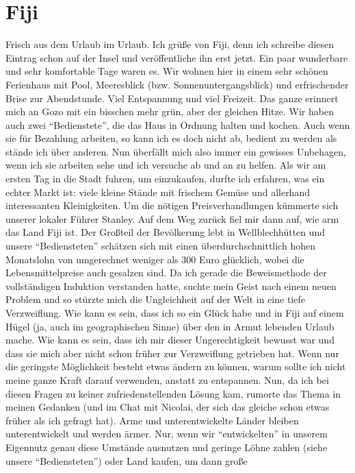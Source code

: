 \chapter{Fiji}

Frisch aus dem Urlaub im Urlaub. Ich grüße von Fiji, denn ich schreibe
diesen Eintrag schon auf der Insel und veröffentliche ihn erst jetzt.
Ein paar wunderbare und sehr komfortable Tage waren es. Wir wohnen hier
in einem sehr schönen Ferienhaus mit Pool, Meeresblick (bzw.
Sonnenuntergangsblick) und erfrischender Brise zur Abendstunde. Viel
Entspannung und viel Freizeit. Das ganze erinnert mich an Gozo mit ein
bisschen mehr grün, aber der gleichen Hitze. Wir haben auch zwei
``Bedienstete'', die das Haus in Ordnung halten und kochen. Auch wenn
sie für Bezahlung arbeiten, so kann ich es doch nicht ab, bedient zu
werden als stände ich über anderen. Nun überfällt mich also immer ein
gewisses Unbehagen, wenn ich sie arbeiten sehe und ich versuche ab und
an zu helfen. Als wir am ersten Tag in die Stadt fuhren, um einzukaufen,
durfte ich erfahren, was ein echter Markt ist: viele kleine Stände mit
frischem Gemüse und allerhand interessanten Kleinigkeiten. Um die
nötigen Preisverhandlungen kümmerte sich unserer lokaler Führer Stanley.
Auf dem Weg zurück fiel mir dann auf, wie arm das Land Fiji ist. Der
Großteil der Bevölkerung lebt in Wellblechhütten und unsere
``Bediensteten'' schätzen sich mit einen überdurchschnittlich hohen
Monatslohn von umgerechnet weniger als 300 Euro glücklich, wobei die
Lebensmittelpreise auch gesalzen sind. Da ich gerade die Beweismethode
der vollständigen Induktion verstanden hatte, suchte mein Geist nach
einem neuen Problem und so stürzte mich die Ungleichheit auf der Welt in
eine tiefe Verzweiflung. Wie kann es sein, dass ich so ein Glück habe
und in Fiji auf einem Hügel (ja, auch im geographischen Sinne) über den
in Armut lebenden Urlaub mache. Wie kann es sein, dass ich mir dieser
Ungerechtigkeit bewusst war und dass sie mich aber nicht schon früher
zur Verzweiflung getrieben hat. Wenn nur die geringste Möglichkeit
besteht etwas ändern zu können, warum sollte ich nicht meine ganze Kraft
darauf verwenden, anstatt zu entspannen. Nun, da ich bei diesen Fragen
zu keiner zufriedenstellenden Lösung kam, rumorte das Thema in meinen
Gedanken (und im Chat mit Nicolai, der sich das gleiche schon etwas
früher als ich gefragt hat). Arme und unterentwickelte Länder bleiben
unterentwickelt und werden ärmer. Nur, wenn wir ``entwickelten'' in
unserem Eigennutz genau diese Umstände ausnutzen und geringe Löhne
zahlen (siehe unsere ``Bediensteten'') oder Land kaufen, um dann große
